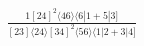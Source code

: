 \documentclass[varwidth, border=5pt]{standalone}
\begin{document}
\begin{my}
$\begin{gathered}
\scriptscriptstyle\frac{1[24]^2⟨46⟩⟨6|1+5|3]}{[23]⟨24⟩[34]^2⟨56⟩⟨1|2+3|4]}
\end{gathered}$
\end{my}
\end{document}

